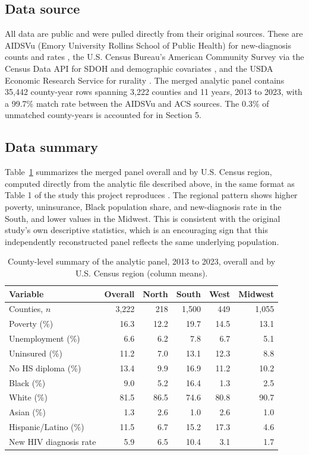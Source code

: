 \documentclass[11pt,letterpaper]{article}
\begin{document}
\subsection{Data source}
All data are public and were pulled directly from their original sources. These are AIDSVu (Emory University Rollins School of Public Health) for new-diagnosis counts and rates \cite{aidsvu_resources, aidsvu_methods, sullivan2020_jmir}, the U.S. Census Bureau's American Community Survey via the Census Data API for SDOH and demographic covariates \cite{census_acs}, and the USDA Economic Research Service for rurality \cite{usda_rucc}. The merged analytic panel contains 35,442 county-year rows spanning 3,222 counties and 11 years, 2013 to 2023, with a 99.7\% match rate between the AIDSVu and ACS sources. The 0.3\% of unmatched county-years is accounted for in Section 5.

\subsection{Data summary}
Table~\ref{tab:datasummary} summarizes the merged panel overall and by U.S. Census region, computed directly from the analytic file described above, in the same format as Table 1 of the study this project reproduces \cite{garrett2026}. The regional pattern shows higher poverty, uninsurance, Black population share, and new-diagnosis rate in the South, and lower values in the Midwest. This is consistent with the original study's own descriptive statistics, which is an encouraging sign that this independently reconstructed panel reflects the same underlying population.

\begin{table}[h]
\centering
\caption{County-level summary of the analytic panel, 2013 to 2023, overall and by U.S. Census region (column means).}
\label{tab:datasummary}
\small
\begin{tabular}{@{}lrrrrr@{}}
\toprule
\textbf{Variable} & \textbf{Overall} & \textbf{North} & \textbf{South} & \textbf{West} & \textbf{Midwest} \\
\midrule
Counties, $n$ & 3{,}222 & 218 & 1{,}500 & 449 & 1{,}055 \\
Poverty (\%) & 16.3 & 12.2 & 19.7 & 14.5 & 13.1 \\
Unemployment (\%) & 6.6 & 6.2 & 7.8 & 6.7 & 5.1 \\
Uninsured (\%) & 11.2 & 7.0 & 13.1 & 12.3 & 8.8 \\
No HS diploma (\%) & 13.4 & 9.9 & 16.9 & 11.2 & 10.2 \\
Black (\%) & 9.0 & 5.2 & 16.4 & 1.3 & 2.5 \\
White (\%) & 81.5 & 86.5 & 74.6 & 80.8 & 90.7 \\
Asian (\%) & 1.3 & 2.6 & 1.0 & 2.6 & 1.0 \\
Hispanic/Latino (\%) & 11.5 & 6.7 & 15.2 & 17.3 & 4.6 \\
New HIV diagnosis rate\footnotemark & 5.9 & 6.5 & 10.4 & 3.1 & 1.7 \\
\bottomrule
\end{tabular}
\end{table}
\end{document}
